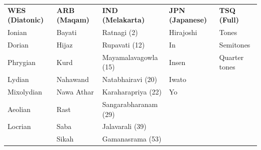 \documentclass[11pt]{article}
\begin{document}
\vspace{0.5cm}

\begin{center}
\begin{tcolorbox}[
  standard jigsaw,
  colframe=black,
  colback=white,
  sharp corners,
  width=0.7\textwidth,
  title=Groups and their scales
]
  \vspace{0.4cm}
  \begin{center}
    \begin{tabular}{@{}l|l|l|l|l@{}}
      \textbf{WES (Diatonic)} & \textbf{ARB (Maqam)} & \textbf{IND (Melakarta)} & \textbf{JPN (Japanese)} & \textbf{TSQ (Full)} \\
      Ionian & Bayati & Ratnagi (2) & Hirajoshi & Tones \\
      Dorian  & Hijaz & Rupavati (12) & In & Semitones \\
      Phrygian   & Kurd & Mayamalavagowla (15) & Insen & Quarter tones \\
      Lydian    & Nahawand & Natabhairavi (20) & Iwato & \\
      Mixolydian   & Nawa Athar & Karaharapriya (22) & Yo & \\
      Aeolian  & Rast & Sangarabharanam (29) & & \\
      Locrian   & Saba & Jalavarali (39) & & \\
          & Sikah & Gamanasrama (53) & &
    \end{tabular}
  \end{center}
  \vspace{0.4cm}
\end{tcolorbox}
\end{center}

\newpage
\end{document}
